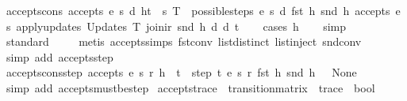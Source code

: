 \begin{isabellebody}
\endisatagproof
{\isafoldproof}%
%
\isadelimproof
\isanewline
%
\endisadelimproof
\isanewline
{}\isamarkupfalse%
\ accepts{\isacharunderscore}cons{\isacharcolon}\ {\isachardoublequoteopen}accepts\ e\ s\ d\ {\isacharparenleft}h{\isacharhash}t{\isacharparenright}\ {\isacharequal}\ {\isacharparenleft}{\isasymexists}{\isacharparenleft}s{\isacharprime}{\isacharcomma}\ T{\isacharparenright}\ {\isacharbar}{\isasymin}{\isacharbar}\ possible{\isacharunderscore}steps\ e\ s\ d\ {\isacharparenleft}fst\ h{\isacharparenright}\ {\isacharparenleft}snd\ h{\isacharparenright}{\isachardot}\ accepts\ e\ s{\isacharprime}\ {\isacharparenleft}apply{\isacharunderscore}updates\ {\isacharparenleft}Updates\ T{\isacharparenright}\ {\isacharparenleft}join{\isacharunderscore}ir\ {\isacharparenleft}snd\ h{\isacharparenright}\ d{\isacharparenright}\ d{\isacharparenright}\ t{\isacharparenright}{\isachardoublequoteclose}\isanewline
%
\isadelimproof
\ \ %
\endisadelimproof
%
\isatagproof
{}\isamarkupfalse%
\ {\isacharparenleft}cases\ h{\isacharparenright}\isanewline
\ \ \isamarkupfalse%
\ simp\isanewline
\ \ \isamarkupfalse%
\ standard\isanewline
\ \ \ \isamarkupfalse%
\ {\isacharparenleft}metis\ accepts{\isachardot}simps\ fst{\isacharunderscore}conv\ list{\isachardot}distinct{\isacharparenleft}{}{\isacharparenright}\ list{\isachardot}inject\ snd{\isacharunderscore}conv{\isacharparenright}\isanewline
\ \ \isamarkupfalse%
\ {\isacharparenleft}simp\ add{\isacharcolon}\ accepts{\isachardot}step{\isacharparenright}%
\endisatagproof
{\isafoldproof}%
%
\isadelimproof
\isanewline
%
\endisadelimproof
\isanewline
{}\isamarkupfalse%
\ accepts{\isacharunderscore}cons{\isacharunderscore}step{\isacharcolon}\ {\isachardoublequoteopen}accepts\ e\ s\ r\ {\isacharparenleft}h\ {\isacharhash}\ t{\isacharparenright}\ {\isasymLongrightarrow}\ step\ t\ e\ s\ r\ {\isacharparenleft}fst\ h{\isacharparenright}\ {\isacharparenleft}snd\ h{\isacharparenright}\ {\isasymnoteq}\ \ None{\isachardoublequoteclose}\isanewline
%
\isadelimproof
\ \ %
\endisadelimproof
%
\isatagproof
{}\isamarkupfalse%
\ {\isacharparenleft}simp\ add{\isacharcolon}\ accepts{\isacharunderscore}must{\isacharunderscore}be{\isacharunderscore}step{\isacharparenright}%
\endisatagproof
{\isafoldproof}%
%
\isadelimproof
\isanewline
%
\endisadelimproof
\isanewline
{}\isamarkupfalse%
\ accepts{\isacharunderscore}trace\ {\isacharcolon}{\isacharcolon}\ {\isachardoublequoteopen}transition{\isacharunderscore}matrix\ {\isasymRightarrow}\ trace\ {\isasymRightarrow}\ bool{\isachardoublequoteclose}\ \isanewline

\end{isabellebody}
